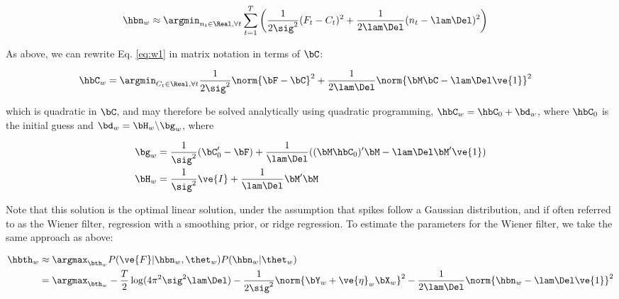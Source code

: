 \documentclass[12pt]{article}
\newcommand{\hC}{\widehat{C}}
\newcommand{\hn}{\widehat{n}}
\begin{document}
\begin{align} \label{eq:w1}
\hbn_{w} &\approx \argmin_{n_t \in \Real, \forall t} \sum_{t=1}^T \bigg(\frac{1}{2\sig^2} (F_t-C_t)^2 + \frac{1}{2 \lam \Del} (n_t - \lam \Del)^2\bigg)%
\end{align}

\noindent As above, we can rewrite Eq. \eqref{eq:w1} in matrix notation in terms of $\bC$:

\begin{align}   \label{eq:w2}
\hbC_{w}&= \argmin_{C_t \in \Real, \forall t} \frac{1}{2\sig^2} \norm{\bF - \bC}^2 + \frac{1}{2\lam\Del} \norm{\bM \bC - \lam\Del\ve{1}}^2 
\end{align}

\noindent which is quadratic in $\bC$, and may therefore be solved analytically using quadratic programming, $\hbC_w = \hbC_0 + \bd_w$, where $\hbC_0$ is the initial guess and $\bd_w=\bH_w \backslash \bg_w$, where

\begin{align}
\bg_w &= \frac{1}{\sig^2} (\bC_0' - \bF) + \frac{1}{\lam\Del} ( (\bM \hbC_0)' \bM - \lam\Del \bM' \ve{1}) \\
\bH_w &= \frac{1}{\sig^2} \ve{I} + \frac{1}{\lam\Del} \bM' \bM
\end{align}

Note that this solution is the optimal linear solution, under the assumption that spikes follow a Gaussian distribution, and if often referred to as the Wiener filter, regression with a smoothing prior, or ridge regression.  To estimate the parameters for the Wiener filter, we take the same approach as above:

\begin{subequations}
\begin{align} \label{eq:w_par}
\hbth_w &\approx \argmax_{\bth_w}P(\ve{F}| \hbn_w, \thet_w) P(\hbn_w | \thet_w) \\
&= \argmax_{\bth_w} -\frac{T}{2} \log (4\pi^2\sig^2\lam\Del) - \frac{1}{2\sig^2} \norm{\bY_w + \ve{\eta}_w \bX_w}^2 - \frac{1}{2\lam\Del} \norm{\hbn_w - \lam\Del\ve{1}}^2
\end{align}
\end{subequations}
\end{document}
